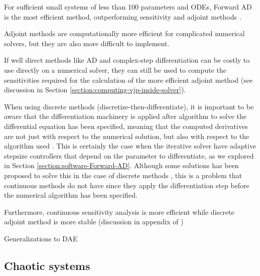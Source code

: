 For sufficient small systems of less than 100 parameters and ODEs, Forward AD is the most efficient method, outperforming sensitivity and adjoint methods \cite{ma_comparison_2021}.

Adjoint methods are computationally more efficient for complicated numerical solvers, but they are also more difficult to implement.

If well direct methods like AD and complex-step differentiation can be costly to use directly on a numerical solver, they can still be used to compute the sensitivities required for the calculation of the more efficient adjoint method (see discussion in Section \ref{section:computing-vjp-inside-solver}). 

When using discrete methods (discretize-then-differentiate), it is important to be aware that the differentiation machinery is applied after algorithm to solve the differential equation has been specified, meaning that the computed derivatives are not just with respect to the numerical solution, but also with respect to the algorithm used \cite{Eberhard_Bischof_1996}.
This is certainly the case when the iterative solver have adaptive stepsize controllers that depend on the parameter to differentiate, as we explored in Section \ref{section:software-Forward-AD}.
Although some solutions has been proposed to solve this in the case of discrete methods \cite{Eberhard_Bischof_1996}, this is a problem that continuous methods do not have since they apply the differentiation step before the numerical algorithm has been specified. 

Furthermore, continuous sensitivity analysis is more efficient while discrete adjoint method is more stable (discussion in appendix of \cite{rackauckas2020universal})

Generalizations to DAE \cite{Cao_Li_Petzold_2002}

\subsection{Chaotic systems}

